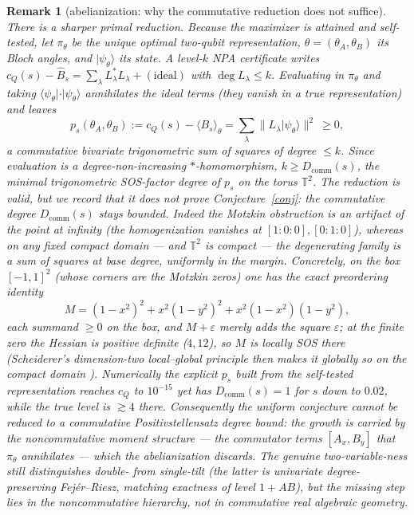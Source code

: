 \documentclass[11pt]{article}
\newtheorem{remark}[theorem]{Remark}
\begin{document}
\begin{remark}[abelianization: why the commutative reduction does not suffice]\label{rem:abelian}
There is a sharper \emph{primal} reduction. Because the maximizer is attained and
self-tested, let $\pi_\theta$ be the unique optimal two-qubit representation,
$\theta=(\theta_A,\theta_B)$ its Bloch angles, and $|\psi_\theta\rangle$ its state.
A level-$k$ NPA certificate writes $c_Q(s)-\widehat B_s=\sum_\lambda L_\lambda^*
L_\lambda+(\text{ideal})$ with $\deg L_\lambda\le k$. Evaluating in $\pi_\theta$ and
taking $\langle\psi_\theta|\cdot|\psi_\theta\rangle$ annihilates the ideal terms
(they vanish in a true representation) and leaves
\[
  p_s(\theta_A,\theta_B):=c_Q(s)-\langle B_s\rangle_\theta
  =\sum_\lambda\big\|L_\lambda|\psi_\theta\rangle\big\|^2\ \ge 0,
\]
a \emph{commutative} bivariate trigonometric sum of squares of degree $\le k$.
Since evaluation is a degree-non-increasing $*$-homomorphism, $k\ge D_{\mathrm{comm}}
(s)$, the minimal trigonometric SOS-factor degree of $p_s$ on the torus $\mathbb T^2$.
The reduction is valid, but we record that it \emph{does not} prove
Conjecture~\ref{conj}: the commutative degree $D_{\mathrm{comm}}(s)$ stays
\emph{bounded}. Indeed the Motzkin obstruction is an artifact of the point at infinity
(the homogenization vanishes at $[1{:}0{:}0],[0{:}1{:}0]$), whereas on any fixed
\emph{compact} domain --- and $\mathbb T^2$ is compact --- the degenerating family is
a sum of squares at \emph{base} degree, uniformly in the margin. Concretely, on the
box $[-1,1]^2$ (whose corners are the Motzkin zeros) one has the exact preordering
identity
\[
  M=(1-x^2)^2+x^2(1-y^2)^2+x^2(1-x^2)(1-y^2),
\]
each summand $\ge0$ on the box, and $M+\varepsilon$ merely adds the square $\varepsilon$;
at the finite zero the Hessian is positive definite ($4,12$), so $M$ is locally SOS
there (Scheiderer's dimension-two local--global principle then makes it globally so on
the compact domain \cite{ScheidererSurf}). Numerically the explicit $p_s$ built from the
self-tested representation reaches $c_Q$ to $10^{-15}$ yet has $D_{\mathrm{comm}}(s)=1$
for $s$ down to $0.02$, while the true level is $\gtrsim4$ there. Consequently the
uniform conjecture \emph{cannot} be reduced to a commutative Positivstellensatz degree
bound: the growth is carried by the noncommutative moment structure --- the commutator
terms $[A_x,B_y]$ that $\pi_\theta$ annihilates --- which the abelianization discards.
The genuine two-variable-ness still distinguishes double- from single-tilt (the latter
is univariate degree-preserving Fej\'er--Riesz, matching exactness of level $1{+}AB$),
but the missing step lies in the \emph{noncommutative} hierarchy, not in commutative
real algebraic geometry.
\end{remark}
\end{document}
